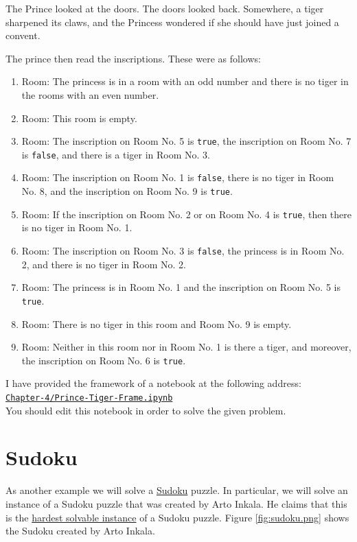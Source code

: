 The Prince looked at the doors. The doors looked back. Somewhere, a tiger sharpened its claws, and the Princess
wondered if she should have just joined a convent.

The prince then read the inscriptions. These were as follows:
\begin{enumerate}
\item Room: The princess is in a room with an odd number and
      there is no tiger in the rooms with an even number.
\item Room: This room is empty.
\item Room: The inscription on Room No. 5 is \texttt{true}, the inscription on Room No. 7 is \texttt{false},
      and there is a tiger in Room No. 3.
\item Room: The inscription on Room No. 1 is \texttt{false}, there is no tiger in Room No. 8,
      and the inscription on Room No. 9 is \texttt{true}.
\item Room: If the inscription on Room No. 2 or on Room No. 4 is \texttt{true},
      then there is no tiger in Room No. 1.
\item Room: The inscription on Room No. 3 is \texttt{false}, the princess is in Room No. 2,
      and there is no tiger in Room No. 2.
\item Room: The princess is in Room No. 1 and the inscription on Room No. 5 is \texttt{true}.
\item Room: There is no tiger in this room and Room No. 9 is empty.
\item Room: Neither in this room nor in Room No. 1 is there a tiger, and moreover, the
      inscription on Room No. 6 is \texttt{true}.
\end{enumerate} 
I have provided the framework of a notebook at the following address:
\\[0.2cm]
\hspace*{1.3cm}
\href{https://github.com/karlstroetmann/Logic/blob/master/TypeScript/Chapter-4/Prince-Tiger-Frame.ipynb}{\texttt{Chapter-4/Prince-Tiger-Frame.ipynb}}
\\[0.2cm]
You should edit this notebook in order to solve the given problem. \eox
\vspace*{1cm}


\section{Sudoku}
As another example we will solve a \href{https://en.wikipedia.org/wiki/Sudoku}{Sudoku} puzzle.  In particular,
we will solve an instance of a Sudoku puzzle that was created by Arto Inkala.  He claims that this is the
\href{https://abcnews.go.com/blogs/headlines/2012/06/can-you-solve-the-hardest-ever-sudoku}{hardest solvable instance}
of a Sudoku puzzle.  Figure \ref{fig:sudoku.png} shows the Sudoku created by Arto Inkala.

